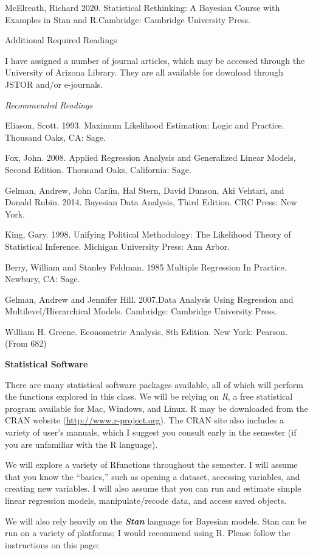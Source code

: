 \documentclass[
]{book}
\begin{document}
McElreath, Richard 2020. Statistical Rethinking: A Bayesian Course with Examples in Stan and R.Cambridge: Cambridge University Press.

Additional Required Readings

I have assigned a number of journal articles, which may be accessed through the University of Arizona Library. They are all available for download through JSTOR and/or e-journals.

\emph{Recommended Readings}

Eliason, Scott. 1993. Maximum Likelihood Estimation: Logic and Practice. Thousand Oaks, CA: Sage.

Fox, John. 2008. Applied Regression Analysis and Generalized Linear Models, Second Edition. Thousand Oaks, California: Sage.

Gelman, Andrew, John Carlin, Hal Stern, David Dunson, Aki Vehtari, and Donald Rubin. 2014. Bayesian Data Analysis, Third Edition. CRC Press: New York.

King, Gary. 1998. Unifying Political Methodology: The Likelihood Theory of Statistical Inference. Michigan University Press: Ann Arbor.

Berry, William and Stanley Feldman. 1985 Multiple Regression In Practice. Newbury, CA: Sage.

Gelman, Andrew and Jennifer Hill. 2007.Data Analysis Using Regression and Multilevel/Hierarchical Models. Cambridge: Cambridge University Press.

William H. Greene. Econometric Analysis, 8th Edition. New York: Pearson. (From 682)

\textbf{Statistical Software}

There are many statistical software packages available, all of which will perform the functions explored in this class. We will be relying on \emph{R}, a free statistical program available for Mac, Windows, and Linux. R may be downloaded from the CRAN website (\url{http://www.r-project.org}). The CRAN site also includes a variety of user's manuals, which I suggest you consult early in the semester (if you are unfamiliar with the R language).

We will explore a variety of Rfunctions throughout the semester. I will assume that you know the ``basics,'' such as opening a dataset, accessing variables, and creating new variables. I will also assume that you can run and estimate simple linear regression models, manipulate/recode data, and access saved objects.

We will also rely heavily on the \textbf{\emph{Stan}} language for Bayesian models. Stan can be run on a variety of platforms; I would recommend using R. Please follow the instructions on this page:
\end{document}
